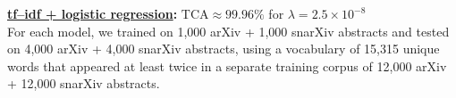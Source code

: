 \documentclass[paperwidth=40in,paperheight=32in,margin=1in,fontscale=0.33]{baposter}
\begin{document}
\begin{poster}
{\begin{figure}[H]
	\end{figure}
%
\textbf{\underline{tf--idf + logistic regression}:} $\text{TCA} \approx 99.96\%$ for $\lambda=2.5\times10^{-8}$
\\

For each model, we trained on 1,000 arXiv + 1,000 snarXiv abstracts and tested on 4,000 arXiv + 4,000 snarXiv abstracts, using a vocabulary of 15,315 unique words that appeared at least twice in a separate training corpus of 12,000 arXiv + 12,000 snarXiv abstracts.

}
\end{poster}
\end{document}
